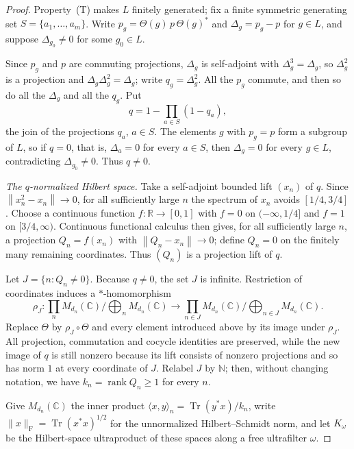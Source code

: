 \documentclass[11pt]{amsart}
\theoremstyle{definition}
\theoremstyle{remark}
\theoremstyle{plain}
\newcommand{\C}{\mathbb C}
\newcommand{\opnorm}[1]{\left\lVert #1\right\rVert}
\begin{document}
\begin{proof}
Property~\textup{(T)} makes $L$ finitely generated; fix a finite
symmetric generating set $S=\{a_1,\dots,a_m\}$.  Write
$p_g=\Theta(g)\,p\,\Theta(g)^{*}$ and $\Delta_g=p_g-p$ for $g\in L$, and
suppose $\Delta_{g_0}\ne0$ for some $g_0\in L$.

Since $p_g$ and $p$ are commuting projections, $\Delta_g$ is self-adjoint
with $\Delta_g^{3}=\Delta_g$, so $\Delta_g^{2}$ is a projection and $\Delta_g\Delta_g^{2}=\Delta_g$;
write $q_g=\Delta_g^{2}$.  All the $p_g$ commute, and then so do all the $\Delta_g$
and all the $q_g$.  Put
\[
 q=1-\prod_{a\in S}(1-q_a),
\]
the join of the projections $q_a$, $a\in S$.  The elements $g$ with
$p_g=p$ form a subgroup of $L$, so if $q=0$, that is, $\Delta_a=0$ for
every $a\in S$, then $\Delta_g=0$ for every $g\in L$, contradicting
$\Delta_{g_0}\ne0$.  Thus $q\ne0$.

\emph{The $q$-normalized Hilbert space.}  Take a self-adjoint bounded
lift $(x_n)$ of $q$.  Since $\opnorm{x_n^{2}-x_n}\to0$, for all
sufficiently large $n$ the spectrum of $x_n$ avoids $[1/4,3/4]$.
Choose a continuous function $f\colon\mathbb R\to[0,1]$ with
$f=0$ on $(-\infty,1/4]$ and $f=1$ on $[3/4,\infty)$.  Continuous
functional calculus then gives, for all sufficiently large $n$, a
projection $Q_n=f(x_n)$ with $\opnorm{Q_n-x_n}\to0$; define $Q_n=0$
on the finitely many remaining coordinates.  Thus $(Q_n)$ is a
projection lift of $q$.

Let $J=\{n:Q_n\ne0\}$.  Because $q\ne0$, the set $J$ is infinite.
Restriction of coordinates induces a $*$-homomorphism
\[
 \rho_J\colon
 \prod_nM_{d_n}(\mathbb C)/\bigoplus_nM_{d_n}(\mathbb C)
 \longrightarrow
 \prod_{n\in J}M_{d_n}(\mathbb C)/\bigoplus_{n\in J}M_{d_n}(\mathbb C).
\]
Replace $\Theta$ by $\rho_J\circ\Theta$ and every element introduced
above by its image under $\rho_J$.  All projection, commutation and
cocycle identities are preserved, while the new image of $q$ is still
nonzero because its lift consists of nonzero projections and so
has norm $1$ at every coordinate of $J$.  Relabel $J$ by $\mathbb N$;
then, without changing notation, we have
$k_n=\operatorname{rank}Q_n\ge1$ for every $n$.

Give $M_{d_n}(\C)$ the inner product
$\langle x,y\rangle_n=\operatorname{Tr}(y^{*}x)/k_n$, write
$\lVert x\rVert_{\mathrm F}=\operatorname{Tr}(x^{*}x)^{1/2}$ for the
unnormalized Hilbert--Schmidt norm, and let $K_\omega$ be the
Hilbert-space ultraproduct of these spaces along a free ultrafilter
$\omega$.


\end{proof}
\end{document}
